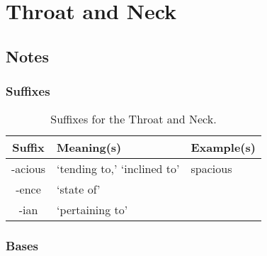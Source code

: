 %
%
%
\chapter{Throat and Neck}
\label{Throat} %








\abstract{}


\section{Notes}
\label{sec:NOTE9}


\subsection{Suffixes}


\begin{longtable}{c | p{} | p{}}
    \caption{Suffixes for the Throat and Neck.}
    \hline
    Suffix & Meaning(s) & Example(s) \\ \hline
        -acious & `tending to,' `inclined to' & spacious \\
        -ence & `state of' & \\
        -ian & `pertaining to'
    \label{tab:Ch9Suffix}
\end{longtable}


\subsection{Bases}



